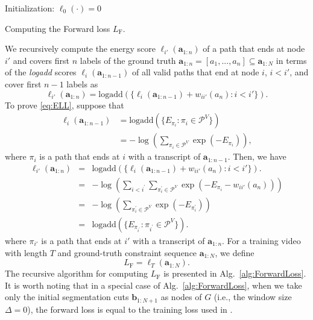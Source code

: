 \documentclass[10pt,twocolumn,letterpaper]{article}
\begin{document}
\begin{algorithm}[t]
\SetAlgoLined
{}
Initialization: $\ell_0(\cdot) = 0$ \;
\caption{Computing the Forward loss  $L_\text{F}$. }
\label{alg:ForwardLoss}
\end{algorithm}


We recursively compute the energy score $\ell_{i'}(\bm{a}_{1:n})$ of a path that ends at node $i'$ and covers first $n$ labels of the ground truth   $\bm{a}_{1:n}=[a_1,...,a_n]\subseteq \bm{a}_{1:N}$ in terms of the {\em logadd} scores $\ell_{i}(\bm{a}_{1:n-1})$ of all valid paths that end at node $i$, $i<i'$, and cover first $n-1$ labels as
\begin{equation}\label{eq:ELL}
\ell_{i'}(\bm{a}_{1:n}) = \text{logadd}(\{ \ell_{i}(\bm{a}_{1:n-1}) + w_{ii'}(a_n): i<i'\}).
\end{equation}
To prove \eqref{eq:ELL}, suppose that
\begin{align}
\ell_{i}(\bm{a}_{1:n-1}) & = \text{logadd}(\{E_{\pi_{i}}:\pi_{i} \in \mathcal{P}^V\}) \nonumber \\
 &= -\log(\sum_{\pi_i\in\mathcal{P}^V}\exp(-E_{\pi_i})), 
\end{align}
where $\pi_i$ is a path that ends at $i$ with a transcript of $\bm{a}_{1:n-1}$. Then, we have
\begin{equation}
\begin{array}{lcl}
\ell_{i'}(\bm{a}_{1:n}) &=& \text{logadd}(\{ \ell_{i}(\bm{a}_{1:n-1}) + w_{ii'}(a_n): i<i'\}).\\
&=&\displaystyle -\log(\sum_{i<i^{'}}\sum_{\pi_i^{'}\in\mathcal{P}^V}\exp(-E_{\pi_i}-w_{ii'}(a_n))) \\
&=&-\log(\sum_{\pi_i^{'}\in\mathcal{P}^V}\exp(-E_{\pi_i^{'}})) \\
&=&\text{logadd}(\{E_{\pi_{i^{'}}}:\pi_{i^{'}} \in \mathcal{P}^V\}).
\end{array}
\end{equation}
where $\pi_{i'}$ is a path that ends at $i'$ with a transcript of $\bm{a}_{1:n}$.
For a training video with length $T$ and ground-truth constraint sequence $\bm{a}_{1:N}$, we define
\begin{equation}\label{eq:Viterbi_F}
  L_\text{F} = \ell_T(\bm{a}_{1:N}).
\end{equation}
The recursive algorithm for computing $L_\text{F}$ is presented in Alg.~\ref{alg:ForwardLoss}. It is worth noting that in a special case of Alg.~\ref{alg:ForwardLoss}, when we take only the initial segmentation cuts $\bm{b}_{1:N+1}$ as nodes of $G$ (i.e., the window size $\Delta=0$), the forward loss is equal to the training loss used in \cite{richard2018neuralnetwork}.
\end{document}
